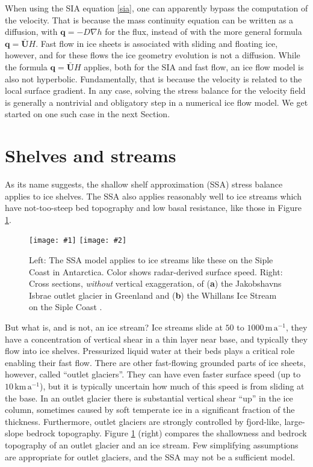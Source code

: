 \documentclass[letterpaper,final,12pt,reqno]{amsart}
\newcommand{\bq}{\mathbf{q}}
\newcommand{\bU}{\mathbf{U}}
\newcommand{\twofigsizes}[5]{
\begin{figure}[ht]
\centering
\texttt{[image: \#1]} \quad
\texttt{[image: \#2]}
\caption{#3}
\label{fig:#1}
\end{figure}}
\begin{document}
When using the SIA equation \eqref{sia}, one can apparently bypass the computation of the velocity.  That is because the mass continuity equation can be written as a diffusion, with $\bq=-D\nabla h$ for the flux, instead of with the more general formula $\bq = \bar{\bU} H$.  Fast flow in ice sheets is associated with sliding and floating ice, however, and for these flows the ice geometry evolution is not a diffusion.  While the formula $\bq = \bar{\bU} H$ applies, both for the SIA and fast flow, an ice flow model is also not hyperbolic.  Fundamentally, that is because the velocity is related to the local surface gradient.  In any case, solving the stress balance for the velocity field is generally a nontrivial and obligatory step in a numerical ice flow model.  We get started on one such case in the next Section.


\section{Shelves and streams}  \label{sec:shelvesandstreams}

As its name suggests, the shallow shelf approximation (SSA) stress balance applies to ice shelves.  The SSA also applies reasonably well to ice streams which have not-too-steep bed topography and low basal resistance, like those in Figure \ref{fig:siple}.

\twofigsizes{siple}{streamisbrae}{Left:  The SSA model applies to ice streams like these on the Siple Coast in Antarctica.  Color shows radar-derived surface speed.  Right: Cross sections, \emph{without} vertical exaggeration, of (\textbf{a}) the Jakobshavns Isbrae outlet glacier in Greenland and (\textbf{b}) the Whillans Ice Stream on the Siple Coast \cite{TrufferEchelmeyer}.}{2.8in}{2.9in}

But what is, and is not, an ice stream?  Ice streams slide at $50$ to $1000 \,\text{m}\,\text{a}^{-1}$, they have a concentration of vertical shear in a thin layer near base, and typically they flow into ice shelves.  Pressurized liquid water at their beds plays a critical role enabling their fast flow.  There are other fast-flowing grounded parts of ice sheets, however, called ``outlet glaciers''.  They can have even faster surface speed (up to $10 \,\text{km}\,\text{a}^{-1}$), but it is typically uncertain how much of this speed is from sliding at the base.  In an outlet glacier there is substantial vertical shear ``up'' in the ice column, sometimes caused by soft temperate ice in a significant fraction of the thickness.  Furthermore, outlet glaciers are strongly controlled by fjord-like, large-slope bedrock topography.  Figure \ref{fig:siple} (right) compares the shallowness and bedrock topography of an outlet glacier and an ice stream.  Few simplifying assumptions are appropriate for outlet glaciers, and the SSA may not be a sufficient model.
\end{document}
